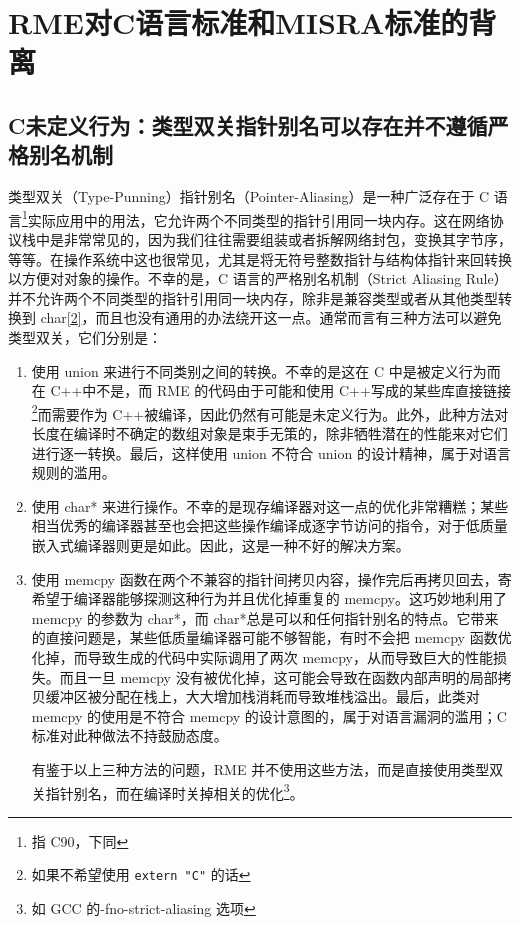 \section{RME对C语言标准和MISRA标准的背离}\label{sec:9-c-and-misra-deviations}

\subsection{C未定义行为：类型双关指针别名可以存在并不遵循严格别名机制}\label{subsec:9-type-punning-aliasing}

类型双关（Type-Punning）指针别名（Pointer-Aliasing）是一种广泛存在于 C 语言\footnote{指 C90，下同}实际应用中的用法，它允许两个不同类型的指针引用同一块内存。这在网络协议栈中是非常常见的，因为我们往往需要组装或者拆解网络封包，变换其字节序，等等。在操作系统中这也很常见，尤其是将无符号整数指针与结构体指针来回转换以方便对对象的操作。不幸的是，C 语言的严格别名机制（Strict
Aliasing
Rule）并不允许两个不同类型的指针引用同一块内存，除非是兼容类型或者从其他类型转换到 char\hyperref[cite:9-2]{{[}2{]}}，而且也没有通用的办法绕开这一点。通常而言有三种方法可以避免类型双关，它们分别是：

\begin{enumerate}
\def\labelenumi{\arabic{enumi}.}
\item
  使用 union 来进行不同类别之间的转换。不幸的是这在 C 中是被定义行为而在 C++中不是，而 RME 的代码由于可能和使用 C++写成的某些库直接链接\footnote{如果不希望使用 \texttt{extern "C"} 的话}而需要作为 C++被编译，因此仍然有可能是未定义行为。此外，此种方法对长度在编译时不确定的数组对象是束手无策的，除非牺牲潜在的性能来对它们进行逐一转换。最后，这样使用 union 不符合 union 的设计精神，属于对语言规则的滥用。
\item
  使用 char* 来进行操作。不幸的是现存编译器对这一点的优化非常糟糕；某些相当优秀的编译器甚至也会把这些操作编译成逐字节访问的指令，对于低质量嵌入式编译器则更是如此。因此，这是一种不好的解决方案。
\item
  使用 memcpy 函数在两个不兼容的指针间拷贝内容，操作完后再拷贝回去，寄希望于编译器能够探测这种行为并且优化掉重复的 memcpy。这巧妙地利用了 memcpy 的参数为 char*，而 char*总是可以和任何指针别名的特点。它带来的直接问题是，某些低质量编译器可能不够智能，有时不会把 memcpy 函数优化掉，而导致生成的代码中实际调用了两次 memcpy，从而导致巨大的性能损失。而且一旦 memcpy 没有被优化掉，这可能会导致在函数内部声明的局部拷贝缓冲区被分配在栈上，大大增加栈消耗而导致堆栈溢出。最后，此类对 memcpy 的使用是不符合 memcpy 的设计意图的，属于对语言漏洞的滥用；C 标准对此种做法不持鼓励态度。

  有鉴于以上三种方法的问题，RME 并不使用这些方法，而是直接使用类型双关指针别名，而在编译时关掉相关的优化\footnote{如 GCC 的-fno-strict-aliasing 选项}。
\end{enumerate}

